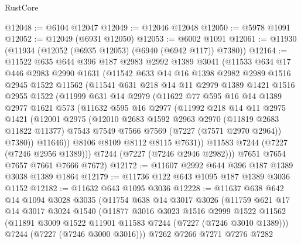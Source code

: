 \begin{lexlean}{RustCore}
\begin{coremodule}
@12048 := @6104 @12047
@12049 := @12046 @12048
@12050 := @5978 @1091
@12052 := @12049 (@6931 @12050)
@12053 := @6002 @1091
@12061 := @11930 (@11934 (@12052 (@6935 @12053) (@6940 (@6942 @117)) @7380))
@12164 := @11522
    @635
    @644
    @396
    @187
    @2983
    @2992
    @1389
    @3041
    (@11533
      @634
      @17
      @446
      @2983
      @2990
      @1631
      (@11542
        @633
        @14
        @16
        @1398
        @2982
        @2989
        @1516
        @2945
        @1522
        @11562
        (@11541
          @631
          @218
          @14
          @11
          @2979
          @1389
          @1421
          @1516
          @2955
          @1522
          (@11999
            @631
            @14
            @2979
            (@11622
              @77
              @595
              @16
              @14
              @1389
              @2977
              @1621
              @573
              (@11632
                @595
                @16
                @2977
                (@11992
                  @218
                  @14
                  @11
                  @2975
                  @1421
                  (@12001
                    @2975
                    (@12010
                      @2683
                      @1592
                      @2963
                      @2970
                      (@11819 @2683 @11822 @11377)
                      @7543
                      @7549
                      @7566
                      @7569
                      (@7227 (@7571 @2970 @2964))
                      @7380))
                  @11646))
              @8106
              @8109
              @8112
              @8115
              @7631))
          @11583
          @7244
          (@7227 (@7246 @2956 @1389)))
        @7244
        (@7227 (@7246 @2946 @2982)))
      @7651
      @7654
      @7657
      @7661
      @7666
      @7672)
@12172 := @11607 @2992 @644 @396 @187 @1389 @3038 @1389 @1864
@12179 := @11736 @122 @643 @1095 @187 @1389 @3036 @1152
@12182 := @11632 @643 @1095 @3036
@12228 := @11637
    @638
    @642
    @14
    @1094
    @3028
    @3035
    (@11754
      @638
      @14
      @3017
      @3026
      (@11759
        @621
        @17
        @14
        @3017
        @3024
        @1540
        (@11877
          @3016
          @3023
          @1516
          @2999
          @1522
          @11562
          (@11891 @3009 @1522 @11901 @11583 @7244 (@7227 (@7246 @3010 @1389)))
          @7244
          (@7227 (@7246 @3000 @3016)))
        @7262
        @7266
        @7271
        @7276
        @7282

\end{coremodule}
\end{lexlean}
